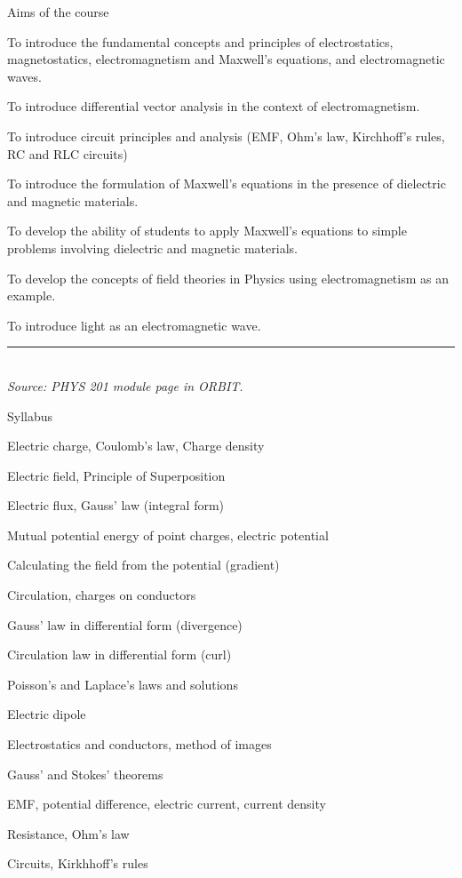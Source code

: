 %
%
%

\begin{frame}{Aims of the course}

\begin{itemize}
{\small
\item
To introduce the fundamental concepts and principles of electrostatics, magnetostatics,
electromagnetism and Maxwell's equations, and electromagnetic waves.
\item
To introduce differential vector analysis in the context of electromagnetism.
\item
To introduce circuit principles and analysis (EMF, Ohm's law, Kirchhoff's rules, RC and RLC circuits)
\item
To introduce the formulation of Maxwell's equations in the presence of dielectric and magnetic materials.
\item
To develop the ability of students to apply Maxwell's equations to simple problems involving dielectric and
magnetic materials.
\item
To develop the concepts of field theories in Physics using electromagnetism as an example.
\item
To introduce light as an electromagnetic wave.
}
\end{itemize}

\vspace{0.2cm}
\noindent\rule{2cm}{0.4pt}\\
{\it \scriptsize Source: PHYS 201 module page in ORBIT.}

\end{frame}

%
%

\begin{frame}{Syllabus}

\begin{itemize}
{\small
\item
Electric charge, Coulomb’s law, Charge density
\item
Electric field, Principle of Superposition
\item
Electric flux, Gauss’ law (integral form)
\item
Mutual potential energy of point charges, electric potential
\item
Calculating the field from the potential (gradient)
\item
Circulation, charges on conductors
\item
Gauss’ law in differential form (divergence)
\item
Circulation law in differential form (curl)
\item
Poisson’s and Laplace’s laws and solutions
\item
Electric dipole
\item
Electrostatics and conductors, method of images
\item
Gauss’ and Stokes’ theorems
\item
EMF, potential difference, electric current, current density
\item
Resistance, Ohm’s law
\item
Circuits, Kirkhhoff’s rules
}
\end{itemize}

\end{frame}


